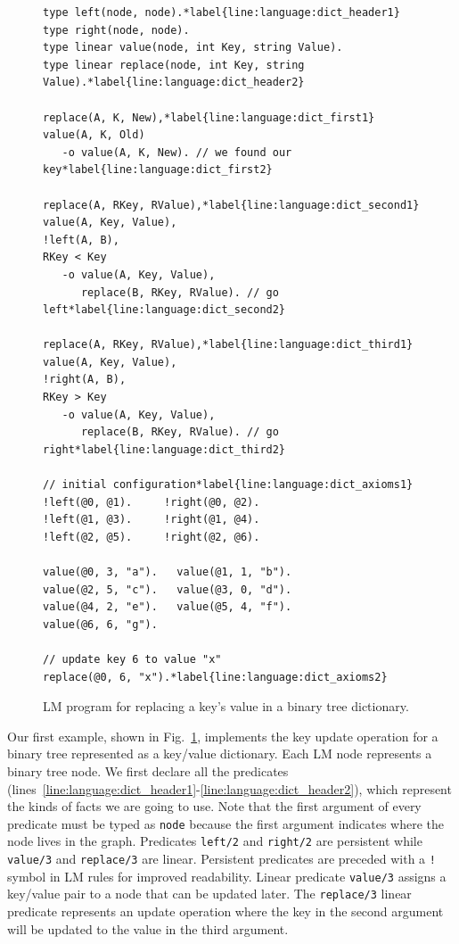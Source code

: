 \begin{figure}[ht]
\begin{Verbatim}[numbers=right,fontsize=\codesize,commandchars=\*\{\}]
type left(node, node).*label{line:language:dict_header1}
type right(node, node).
type linear value(node, int Key, string Value).
type linear replace(node, int Key, string Value).*label{line:language:dict_header2}

replace(A, K, New),*label{line:language:dict_first1}
value(A, K, Old)
   -o value(A, K, New). // we found our key*label{line:language:dict_first2}

replace(A, RKey, RValue),*label{line:language:dict_second1}
value(A, Key, Value),
!left(A, B),
RKey < Key
   -o value(A, Key, Value),
      replace(B, RKey, RValue). // go left*label{line:language:dict_second2}

replace(A, RKey, RValue),*label{line:language:dict_third1}
value(A, Key, Value),
!right(A, B),
RKey > Key
   -o value(A, Key, Value),
      replace(B, RKey, RValue). // go right*label{line:language:dict_third2}

// initial configuration*label{line:language:dict_axioms1}
!left(@0, @1).     !right(@0, @2).
!left(@1, @3).     !right(@1, @4). 
!left(@2, @5).     !right(@2, @6).

value(@0, 3, "a").   value(@1, 1, "b").
value(@2, 5, "c").   value(@3, 0, "d").
value(@4, 2, "e").   value(@5, 4, "f").
value(@6, 6, "g").

// update key 6 to value "x"
replace(@0, 6, "x").*label{line:language:dict_axioms2}
\end{Verbatim}
\caption{LM program for replacing a key's value in a binary tree dictionary.}
\label{code:btree_replace}
\end{figure}

Our first example, shown in Fig.~\ref{code:btree_replace}, implements the key
update operation for a binary tree represented as a key/value dictionary. Each
LM node represents a binary tree node. We first declare all the predicates
(lines~\ref{line:language:dict_header1}-\ref{line:language:dict_header2}), which
represent the kinds of facts we are going to use. Note that the first argument
of every predicate must be typed as \texttt{node} because the first argument
indicates where the node lives in the graph. Predicates \texttt{left/2} and
\texttt{right/2} are persistent while \texttt{value/3} and \texttt{replace/3}
are linear. Persistent predicates are preceded with a \texttt{!} symbol in LM
rules for improved readability. Linear predicate \texttt{value/3} assigns a
key/value pair to a node that can be updated later.  The \texttt{replace/3}
linear predicate represents an update operation where the key in the second
argument will be updated to the value in the third argument.

